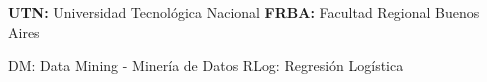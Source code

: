 \textbf{UTN:} Universidad Tecnológica Nacional
\textbf{FRBA:} Facultad Regional Buenos Aires

DM: Data Mining - Minería de Datos
RLog: Regresión Logística

